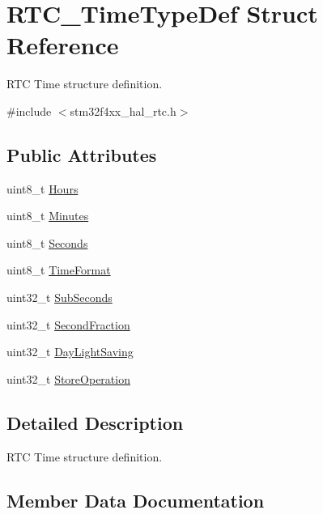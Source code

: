 \hypertarget{struct_r_t_c___time_type_def}{}\section{R\+T\+C\+\_\+\+Time\+Type\+Def Struct Reference}
\label{struct_r_t_c___time_type_def}


R\+TC Time structure definition.  




{\ttfamily \#include $<$stm32f4xx\+\_\+hal\+\_\+rtc.\+h$>$}

\subsection*{Public Attributes}
\begin{DoxyCompactItemize}
\item 
uint8\+\_\+t \hyperlink{struct_r_t_c___time_type_def_afb56ed968b4967d127517ebb4ed40d8b}{Hours}
\item 
uint8\+\_\+t \hyperlink{struct_r_t_c___time_type_def_a362931e6bba28836c36423197e429f29}{Minutes}
\item 
uint8\+\_\+t \hyperlink{struct_r_t_c___time_type_def_a297ae76c2b7de4f939d996d93240c6b2}{Seconds}
\item 
uint8\+\_\+t \hyperlink{struct_r_t_c___time_type_def_a701c21c52472e8caf9e23653ec2fd604}{Time\+Format}
\item 
uint32\+\_\+t \hyperlink{struct_r_t_c___time_type_def_ae24e60a3b9549fd02b00ad6762ae5b77}{Sub\+Seconds}
\item 
uint32\+\_\+t \hyperlink{struct_r_t_c___time_type_def_ab9e6aabb125b82b1e25cd1070a2d2ecb}{Second\+Fraction}
\item 
uint32\+\_\+t \hyperlink{struct_r_t_c___time_type_def_ac873d19a4d99d3f447f96ecae2bf3c5d}{Day\+Light\+Saving}
\item 
uint32\+\_\+t \hyperlink{struct_r_t_c___time_type_def_a7628b757d7c7a4ab30b6bbc45a028b7d}{Store\+Operation}
\end{DoxyCompactItemize}


\subsection{Detailed Description}
R\+TC Time structure definition. 

\subsection{Member Data Documentation}
